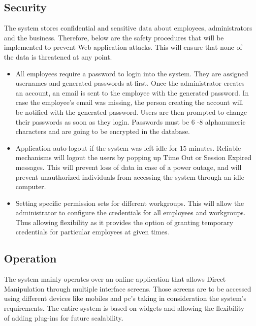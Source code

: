 \documentclass[letterpaper,12pt]{report}
\begin{document}
\subsection{Security} The system stores confidential and sensitive data about employees, administrators and the business. Therefore, below are the safety procedures that will be implemented to prevent Web application attacks. This will ensure that none of the data is threatened at any point. 
\begin{itemize}
 \item All employees require a password to login into the system. They are assigned usernames and generated passwords at first. Once the administrator creates an account, an email is sent to the employee with the generated password. In case the employee’s email was missing, the person creating the account will be notified with the generated password.
Users are then prompted to change their passwords as soon as they login. Passwords must be 6 -8 alphanumeric characters and are going to be encrypted in the database. 
 \item Application auto-logout if the system was left idle for 15 minutes. Reliable mechanisms will logout the users by popping up Time Out or Session Expired messages. This will prevent loss of data in case of a power outage, and will prevent unauthorized individuals from accessing the system through an idle computer.
 \item Setting specific permission sets for different workgroups. This will allow the administrator to configure the credentials for all employees and workgroups. Thus allowing flexibility as it provides the option of granting temporary credentials for particular employees at given times. 
\end{itemize}


\subsection{Operation}
  The system mainly operates over an online application that allows Direct Manipulation through multiple interface screens. Those screens are to be accessed using different devices like mobiles and pc’s taking in consideration the system’s requirements. 
The entire system is based on widgets and allowing the flexibility of adding plug-ins for future scalability.
\end{document}
